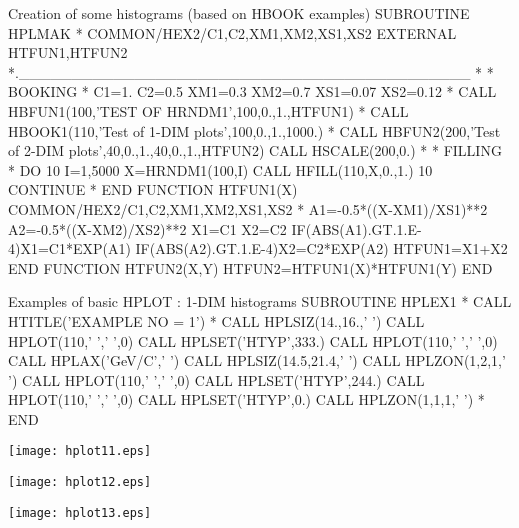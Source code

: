 \newpage

\begin{XMPt}{Creation of some histograms (based on HBOOK examples)}
      SUBROUTINE HPLMAK
*
      COMMON/HEX2/C1,C2,XM1,XM2,XS1,XS2
      EXTERNAL HTFUN1,HTFUN2
*.___________________________________________
*
*             BOOKING
*
      C1=1.
      C2=0.5
      XM1=0.3
      XM2=0.7
      XS1=0.07
      XS2=0.12
*
      CALL HBFUN1(100,'TEST OF HRNDM1',100,0.,1.,HTFUN1)
*
      CALL HBOOK1(110,'Test of 1-DIM plots',100,0.,1.,1000.)
*
      CALL HBFUN2(200,'Test of 2-DIM plots',40,0.,1.,40,0.,1.,HTFUN2)
      CALL HSCALE(200,0.)
*
*             FILLING
*
      DO 10 I=1,5000
         X=HRNDM1(100,I)
         CALL HFILL(110,X,0.,1.)
  10  CONTINUE
*
      END
      FUNCTION HTFUN1(X)
      COMMON/HEX2/C1,C2,XM1,XM2,XS1,XS2
*
      A1=-0.5*((X-XM1)/XS1)**2
      A2=-0.5*((X-XM2)/XS2)**2
      X1=C1
      X2=C2
      IF(ABS(A1).GT.1.E-4)X1=C1*EXP(A1)
      IF(ABS(A2).GT.1.E-4)X2=C2*EXP(A2)
      HTFUN1=X1+X2
      END
      FUNCTION HTFUN2(X,Y)
      HTFUN2=HTFUN1(X)*HTFUN1(Y)
      END
\end{XMPt}

\newpage

\begin{XMPt}{Examples of basic HPLOT : 1-DIM histograms}
      SUBROUTINE HPLEX1
*
      CALL HTITLE('EXAMPLE NO = 1')
*
      CALL HPLSIZ(14.,16.,' ')
      CALL HPLOT(110,' ',' ',0)
      CALL HPLSET('HTYP',333.)
      CALL HPLOT(110,' ',' ',0)
      CALL HPLAX('GeV/C',' ')
      CALL HPLSIZ(14.5,21.4,' ')
      CALL HPLZON(1,2,1,' ')
      CALL HPLOT(110,' ',' ',0)
      CALL HPLSET('HTYP',244.)
      CALL HPLOT(110,' ',' ',0)
      CALL HPLSET('HTYP',0.)
      CALL HPLZON(1,1,1,' ')
*
      END
\end{XMPt}
\newpage
\begin{Fighere}
\begin{center}\texttt{[image: hplot11.eps]}\end{center}
\end{Fighere}
\begin{Fighere}
\begin{center}\texttt{[image: hplot12.eps]}\end{center}
\end{Fighere}
\begin{Fighere}
\begin{center}\texttt{[image: hplot13.eps]}\end{center}
\end{Fighere}


